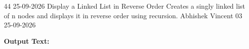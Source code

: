 \clearpage
\label{prog:44}
\programhead
  {44}
  {25-09-2026}
  {Display a Linked List in Reverse Order}
  {Creates a singly linked list of n nodes and displays it in reverse order using recursion.}
  {Abhishek Vincent}
  {03}
  {25-09-2026}

\divider
\textbf{Output Text:}\par
\vspace{2pt}

